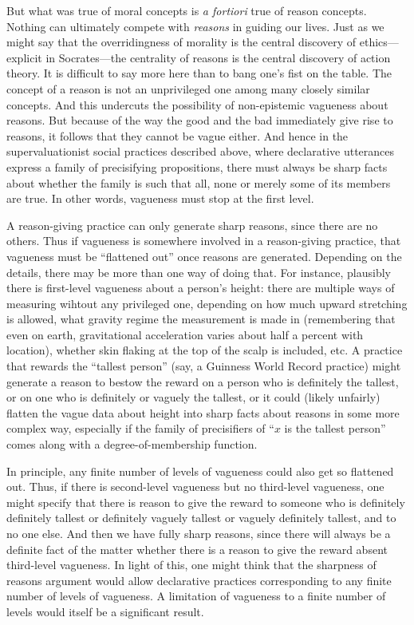But what was true of moral concepts is \textit{a fortiori} true of reason concepts. Nothing can ultimately compete with \textit{reasons} in
guiding our lives. Just as we might say that the overridingness of morality is the central discovery of ethics---explicit in Socrates---the 
centrality of reasons is the central discovery of action theory. It is difficult to say more here than to bang one's fist on the table. 
The concept of a reason is not an unprivileged one among many closely similar concepts. And this undercuts the possibility of 
non-epistemic vagueness about reasons. But because of the way the good and the bad immediately give rise to reasons, it follows that
they cannot be vague either. And hence in the supervaluationist social practices described above, where declarative utterances express a 
family of precisifying propositions, there must always be sharp facts about whether the family is such that all, none or merely some of its
members are true. In other words, vagueness must stop at the first level.

A reason-giving practice can only generate sharp reasons, since there are no others. Thus if vagueness is somewhere involved in a 
reason-giving practice, that vagueness must be ``flattened out'' once reasons are generated. Depending on the details, there may be
more than one way of doing that. For instance, plausibly there is first-level vagueness about a person's height: there are multiple 
ways of measuring wihtout any privileged one, depending on how much upward stretching is allowed, what gravity regime the measurement 
is made in (remembering that even on earth, gravitational acceleration varies about half a percent with location), whether skin flaking 
at the top of the scalp is included, etc.  A practice that rewards the ``tallest person'' (say, a Guinness World Record practice) might
generate a reason to bestow the reward on a person who is definitely the tallest, or on one who is definitely or vaguely the tallest, or
it could (likely unfairly) flatten the vague data about height into sharp facts about reasons in some more complex way, especially if
the family of precisifiers of ``$x$ is the tallest person'' comes along with a degree-of-membership function. 

In principle, any finite number of levels of vagueness could also get so flattened out. Thus, if there is second-level vagueness but no third-level
vagueness, one might specify that there is reason to give the reward to someone who is definitely definitely tallest or 
definitely vaguely tallest or vaguely definitely tallest, and to no one else. And then we have fully sharp reasons, since there will 
always be a definite fact of the matter whether there is a reason to give the reward absent third-level vagueness. In light of this,
one might think that the sharpness of reasons argument would allow declarative practices corresponding to any finite number of levels
of vagueness. A limitation of vagueness to a finite number of levels would itself be a significant result. 

